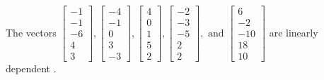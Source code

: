 \begin{exercise}
\begin{exerciseStatement}
  \end{exerciseStatement}
  \begin{exerciseAnswer}
   The vectors \(\left[\begin{array}{r}
-1 \\
-1 \\
-6 \\
4 \\
3
\end{array}\right] , \left[\begin{array}{r}
-4 \\
-1 \\
0 \\
3 \\
-3
\end{array}\right] , \left[\begin{array}{r}
4 \\
0 \\
1 \\
5 \\
2
\end{array}\right] , \left[\begin{array}{r}
-2 \\
-3 \\
-5 \\
2 \\
2
\end{array}\right] , \text{ and } \left[\begin{array}{r}
6 \\
-2 \\
-10 \\
18 \\
10
\end{array}\right]\) are 
  	 linearly dependent  .
  


  \end{exerciseAnswer}
\end{exercise}
